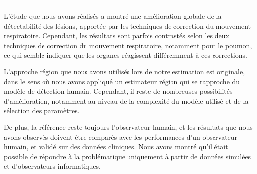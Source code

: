 


\rule{15cm}{0.1em}

\vspace{3cm}

L'étude que nous avons réalisés a montré une amélioration globale de la
détectabilité des lésions, apportée par les techniques de correction du
mouvement respiratoire. Cependant, les résultats sont parfois contrastés
selon les deux techniques de correction du mouvement respiratoire, notamment
pour le poumon, ce qui semble indiquer que les organes réagissent différemment à
ces corrections.

L'approche région que nous avons utilisés lors de notre estimation est
originale, dans le sens où nous avons appliqué un estimateur région qui se
rapproche du modèle de détection humain. Cependant, il reste de nombreuses
possibilités d'amélioration, notamment au niveau de la complexité du modèle
utilisé et de la sélection des paramètres. 

De plus, la référence reste toujours l'observateur humain, et les résultats que
nous avons observés doivent être comparés avec les performances d'un observateur
humain, et validé sur des données cliniques. Nous avons montré qu'il était
possible de répondre à la problématique uniquement à partir de données simulées
et d'observateurs informatiques.